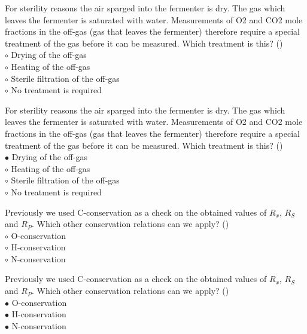 \documentclass[]{beamer}
\begin{document}
\begin{frame}[shrink] {}
\addtocounter{questions}{1}
\color{blue} For sterility reasons the air sparged into the fermenter is dry. The gas which leaves the fermenter is saturated with water. Measurements of O2 and CO2 mole fractions in the off-gas (gas that leaves the fermenter) therefore require a special treatment of the gas before it can be measured. Which treatment is this?  ()\\
\color{black}
\setlength{\parindent}{-0.4cm}
{\color{red}$\circ$}     Drying of the off-gas \\
{\color{red}$\circ$} Heating of the off-gas \\
{\color{red}$\circ$} Sterile filtration of the off-gas\\
{\color{red}$\circ$} No treatment is required
\end{frame}
\begin{frame}[shrink] {}
\addtocounter{answers}{1}
\color{blue} For sterility reasons the air sparged into the fermenter is dry. The gas which leaves the fermenter is saturated with water. Measurements of O2 and CO2 mole fractions in the off-gas (gas that leaves the fermenter) therefore require a special treatment of the gas before it can be measured. Which treatment is this?  ()\\
\color{black}
\setlength{\parindent}{-0.4cm}
{\color{red}$\bullet$}     Drying of the off-gas \\
{\color{red}$\circ$} Heating of the off-gas \\
{\color{red}$\circ$} Sterile filtration of the off-gas\\
{\color{red}$\circ$} No treatment is required
\end{frame}

\begin{frame}[shrink] {}
\addtocounter{questions}{1}
\color{blue}
Previously we used C-conservation as a check on the obtained values of $R_x$, $R_S$ and $R_P$.  Which other conservation relations can we apply?  ()\\
\color{black}
\setlength{\parindent}{-0.4cm}
{\color{red}$\circ$}     O-conservation \\
{\color{red}$\circ$} H-conservation\\
{\color{red}$\circ$} N-conservation  \\
\end{frame}
\begin{frame}[shrink] {}
\addtocounter{answers}{1}
\color{blue}
Previously we used C-conservation as a check on the obtained values of $R_x$, $R_S$ and $R_P$.  Which other conservation relations can we apply?  ()\\
\color{black}
\setlength{\parindent}{-0.4cm}
{\color{red}$\bullet$}     O-conservation \\
{\color{red}$\bullet$} H-conservation\\
{\color{red}$\bullet$} N-conservation  \\
\end{frame}
\end{document}
